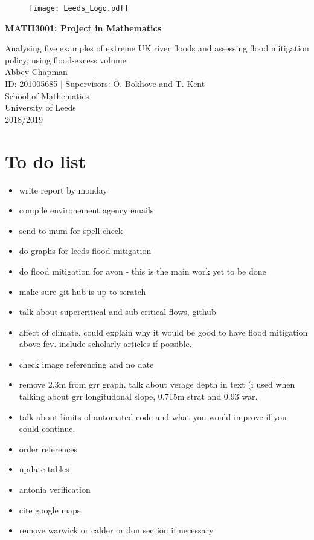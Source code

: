 \documentclass[11pt,a4paper]{article}
\begin{document}

\begin{titlepage}
\begin{center}

\begin{figure}[t]
\raggedleft
\texttt{[image: Leeds\_Logo.pdf]}
\end{figure}
 

\vspace*{5cm}
{\huge \textbf{MATH3001: Project in Mathematics}}\\
\hrulefill

\vspace*{0.1cm}
{\LARGE Analysing five examples of extreme UK river floods and assessing flood mitigation policy, using flood-excess volume}\\
\vspace{1cm}
{\large Abbey Chapman}\\
{\large ID: 201005685 $|$ Supervisors: O. Bokhove and T. Kent}\\
\vfill
School of Mathematics\\
University of Leeds\\
2018/2019
\end{center}
\end{titlepage}

\tableofcontents 
\noindent \hrulefill

\newpage
\section{To do list}
\begin{itemize}
\item write report by monday
\item compile environement agency emails
\item send to mum for spell check
\item do graphs for leeds flood mitigation
\item do flood mitigation for avon - this is the main work yet to be done
\item make sure git hub is up to scratch
\item talk about supercritical and sub critical flows, github
\item affect of climate, could explain why it would be good to have flood mitigation above fev. include scholarly articles if possible.
\item check image referencing and no date
\item remove 2.3m from grr graph. talk about verage depth in text (i used when talking about grr longitudonal slope, 0.715m strat and 0.93 war.
\item talk about limits of automated code and what you would improve if you could continue.
\item order references
\item update tables
\item antonia verification
\item cite google maps.
\item remove warwick or calder or don section if necessary
\end{itemize}
\end{document}
